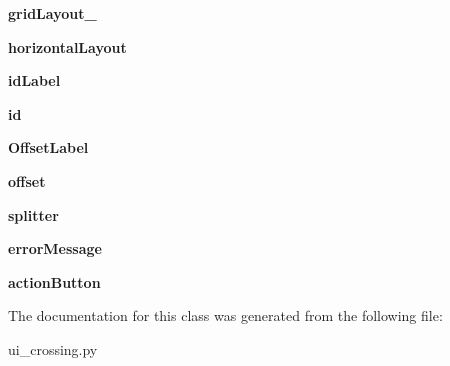 \begin{DoxyCompactItemize}
\item 
\hypertarget{class_sim_g_d_c_1_1ui__crossing_1_1_ui___crossing_a4afe51b7600832e30de3a0c5fcb16d66}{}{\bfseries grid\+Layout\+\_}\label{class_sim_g_d_c_1_1ui__crossing_1_1_ui___crossing_a4afe51b7600832e30de3a0c5fcb16d66}

\item 
\hypertarget{class_sim_g_d_c_1_1ui__crossing_1_1_ui___crossing_a33e30f876da7b4db9f86315c1ccae446}{}{\bfseries horizontal\+Layout}\label{class_sim_g_d_c_1_1ui__crossing_1_1_ui___crossing_a33e30f876da7b4db9f86315c1ccae446}

\item 
\hypertarget{class_sim_g_d_c_1_1ui__crossing_1_1_ui___crossing_afe806565a9d2abcc8656ab242b8bb1ac}{}{\bfseries id\+Label}\label{class_sim_g_d_c_1_1ui__crossing_1_1_ui___crossing_afe806565a9d2abcc8656ab242b8bb1ac}

\item 
\hypertarget{class_sim_g_d_c_1_1ui__crossing_1_1_ui___crossing_ad3752a73329dc4bef61ccd72a214c429}{}{\bfseries id}\label{class_sim_g_d_c_1_1ui__crossing_1_1_ui___crossing_ad3752a73329dc4bef61ccd72a214c429}

\item 
\hypertarget{class_sim_g_d_c_1_1ui__crossing_1_1_ui___crossing_aa7dfc633966f1c3baf07f92913923c17}{}{\bfseries Offset\+Label}\label{class_sim_g_d_c_1_1ui__crossing_1_1_ui___crossing_aa7dfc633966f1c3baf07f92913923c17}

\item 
\hypertarget{class_sim_g_d_c_1_1ui__crossing_1_1_ui___crossing_a5bc0fc82fd6036404cc41b711a64b134}{}{\bfseries offset}\label{class_sim_g_d_c_1_1ui__crossing_1_1_ui___crossing_a5bc0fc82fd6036404cc41b711a64b134}

\item 
\hypertarget{class_sim_g_d_c_1_1ui__crossing_1_1_ui___crossing_a3bb876763ddc0abcd41b6214a90cf5ec}{}{\bfseries splitter}\label{class_sim_g_d_c_1_1ui__crossing_1_1_ui___crossing_a3bb876763ddc0abcd41b6214a90cf5ec}

\item 
\hypertarget{class_sim_g_d_c_1_1ui__crossing_1_1_ui___crossing_ac6c968af5565cbfd7153fd34d6251925}{}{\bfseries error\+Message}\label{class_sim_g_d_c_1_1ui__crossing_1_1_ui___crossing_ac6c968af5565cbfd7153fd34d6251925}

\item 
\hypertarget{class_sim_g_d_c_1_1ui__crossing_1_1_ui___crossing_a314e867845065cd00608d361450153f6}{}{\bfseries action\+Button}\label{class_sim_g_d_c_1_1ui__crossing_1_1_ui___crossing_a314e867845065cd00608d361450153f6}

\end{DoxyCompactItemize}


The documentation for this class was generated from the following file\+:\begin{DoxyCompactItemize}
\item 
ui\+\_\+crossing.\+py\end{DoxyCompactItemize}
